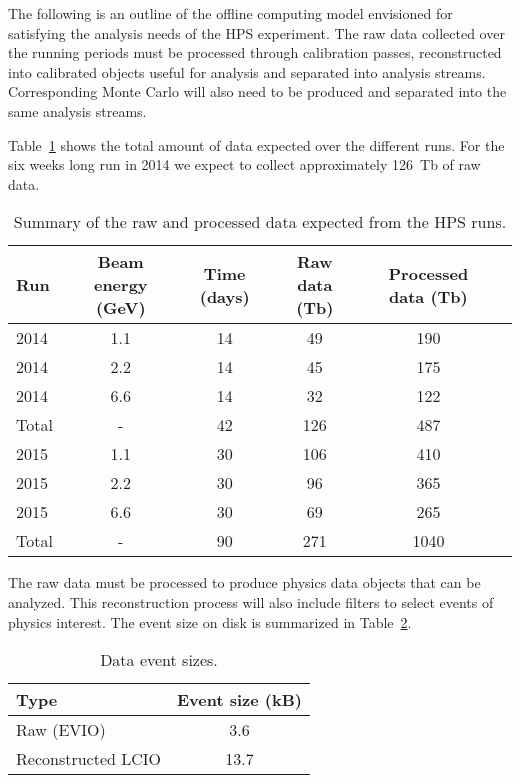 
The following is an outline of the offline computing model envisioned for satisfying the analysis needs of the HPS experiment. The raw data collected over the running periods must be processed through calibration passes, reconstructed into calibrated objects useful for analysis and separated into analysis streams. Corresponding Monte Carlo will also need to be produced and separated into the same analysis streams.

Table~\ref{tab:data_rates} shows 
the total amount of data expected over the 
different runs. For the six weeks long run in 2014 we expect to collect approximately 126~Tb of raw data.
\begin{table}[]
\centering
\begin{tabular}{|l|c|c|c|c|c|}
\hline
Run & Beam energy (GeV) & Time (days) & Raw data (Tb) & Processed data (Tb)\\
\hline
2014 & 1.1 & 14 & 49 & 190 \\
2014 & 2.2 & 14 & 45 & 175  \\
2014 & 6.6 & 14 & 32 & 122  \\
\hline
Total & - & 42 &  126  & 487 \\
\hline
2015 & 1.1 & 30 & 106 & 410 \\
2015 & 2.2 & 30 & 96 & 365 \\
2015 & 6.6 & 30 & 69 & 265 \\
\hline
Total & - & 90 & 271& 1040 \\
\hline
\end{tabular}
\caption{{\small Summary of the raw and processed data expected from the HPS runs. }}
\label{tab:data_rates}
\end{table}
The raw data must be processed to produce physics data objects that can be analyzed. This reconstruction process will also include filters to select events of physics interest. The event size on disk is summarized 
in Table~\ref{tab:raw_data_size}. 
\begin{table}[]
\centering
\begin{tabular}{|l|c|}
\hline
Type & Event size (kB) \\ 
\hline
Raw (EVIO)  &  3.6 \\
\hline
Reconstructed LCIO & 13.7 \\
\hline
\end{tabular}
\caption{{\small Data event sizes. }}
\label{tab:raw_data_size}
\end{table}

